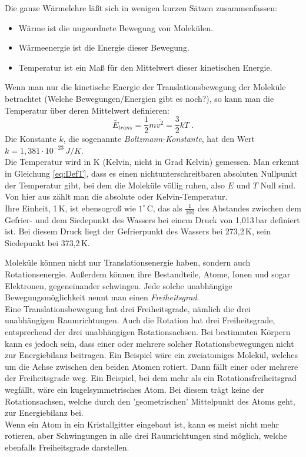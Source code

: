 Die ganze Wärmelehre läßt sich in wenigen kurzen Sätzen zusammenfassen: 
\begin{itemize}
 \item Wärme ist die ungeordnete Bewegung von Molekülen.
 \item Wärmeenergie ist die Energie dieser Bewegung.
 \item Temperatur ist ein Maß für den Mittelwert dieser kinetischen Energie.
\end{itemize}

Wenn man nur die kinetische Energie der Translationsbewegung der Moleküle betrachtet (Welche Bewegungen/Energien gibt es noch?), so kann man die Temperatur über deren Mittelwert definieren:
\begin{equation} \label{eq:DefT}
 \bar{E}_{trans} = \frac{1}{2}m\overline{v^2} = \frac{3}{2}kT\; .
\end{equation}
Die Konstante $k$, die sogenannte \textit{Boltzmann-Konstante}, hat den Wert $k=1,381\cdot10^{-23}\,J/K$.\\
Die Temperatur wird in K (Kelvin, nicht in Grad Kelvin) gemessen. Man erkennt in Gleichung \ref{eq:DefT}, dass es einen nichtunterschreitbaren absoluten Nullpunkt der Temperatur gibt, bei dem die Moleküle völlig ruhen, also $E$ und $T$ Null sind. Von hier aus zählt man die absolute oder Kelvin-Temperatur.\\
Ihre Einheit, 1\,K, ist ebensogroß wie $1^{\circ}$\,C, das als $\frac{1}{100}$ des Abstandes zwischen dem Gefrier- und dem Siedepunkt des Wassers bei einem Druck von 1,013\,bar definiert ist. Bei diesem Druck liegt der Gefrierpunkt des Wassers bei 273,2\,K, sein Siedepunkt bei 373,2\,K.

Moleküle können nicht nur Translationsenergie haben, sondern auch Rotationsenergie. Außerdem können ihre Bestandteile, Atome, Ionen und sogar Elektronen, gegeneinander schwingen. Jede solche unabhängige Bewegungsmöglichkeit nennt man einen \textit{Freiheitsgrad}.\\
Eine Translationsbewegung hat drei Freiheitsgrade, nämlich die drei unabhängigen Raumrichtungen. Auch die Rotation hat drei Freiheitsgrade, entsprechend der drei unabhängigen Rotationsachsen. Bei bestimmten Körpern kann es jedoch sein, dass einer oder mehrere solcher Rotationsbewegungen nicht zur Energiebilanz beitragen. Ein Beispiel wäre ein zweiatomiges Molekül, welches um die Achse zwischen den beiden Atomen rotiert. Dann fällt einer oder mehrere der Freiheitsgrade weg. Ein Beispiel, bei dem mehr als ein Rotationsfreiheitsgrad wegfällt, wäre ein kugelsymmetrisches Atom. Bei diesem trägt keine der Rotationsachsen, welche durch den 'geometrischen' Mittelpunkt des Atoms geht, zur Energiebilanz bei.\\
Wenn ein Atom in ein Kristallgitter eingebaut ist, kann es meist nicht mehr rotieren, aber Schwingungen in alle drei Raumrichtungen sind möglich, welche ebenfalls Freiheitsgrade darstellen.\\

